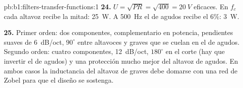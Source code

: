 \begin{solution}{pb:b1:filters-transfer-functions:1}
\textbf{24.} $U = \sqrt{PR} = \sqrt{400} = \qty{20}{V}$ eficaces. En $f_c$
cada altavoz recibe la mitad: \qty{25}{W}. A \qty{500}{Hz} el de agudos
recibe el $6\%$: \qty{3}{W}.

\textbf{25.} Primer orden: dos componentes, complementario en potencia,
pendientes suaves de \qty{6}{dB/oct}, $90^\circ$ entre altavoces y graves
que se cuelan en el de agudos. Segundo orden: cuatro componentes,
\qty{12}{dB/oct}, $180^\circ$ en el corte (hay que invertir el de agudos)
y una protección mucho mejor del altavoz de agudos. En ambos casos la
inductancia del altavoz de graves debe domarse con una red de Zobel para
que el diseño se sostenga.
\end{solution}
